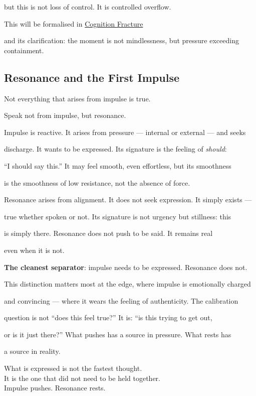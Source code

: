 but this is not loss of control. It is controlled overflow.

This will be formalised in \hyperref[cognition_fracture]{Cognition Fracture}

and its clarification: the moment is not mindlessness, but pressure exceeding containment.

\subsection{Resonance and the First Impulse}

Not everything that arises from impulse is true.

Speak not from impulse, but resonance.

Impulse is reactive. It arises from pressure --- internal or external --- and seeks

discharge. It wants to be expressed. Its signature is the feeling of \textit{should}:

``I should say this.'' It may feel smooth, even effortless, but its smoothness

is the smoothness of low resistance, not the absence of force.

Resonance arises from alignment. It does not seek expression. It simply exists ---

true whether spoken or not. Its signature is not urgency but stillness: this

is simply there. Resonance does not push to be said. It remains real

even when it is not.

\textbf{The cleanest separator}: impulse needs to be expressed. Resonance does not.

This distinction matters most at the edge, where impulse is emotionally charged

and convincing --- where it wears the feeling of authenticity. The calibration

question is not ``does this feel true?'' It is: ``is this trying to get out,

or is it just there?'' What pushes has a source in pressure. What rests has

a source in reality.

\begin{calloutbox}

What is expressed is not the fastest thought.\\

It is the one that did not need to be held together.\\[0.4em]

Impulse pushes. Resonance rests.

\end{calloutbox}

